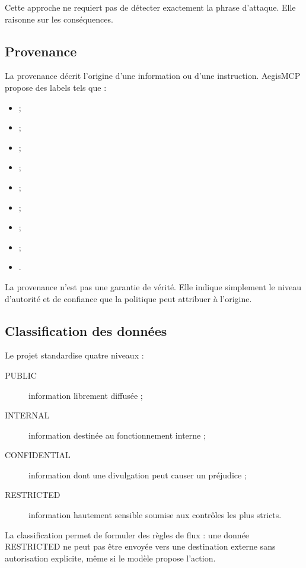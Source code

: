 Cette approche ne requiert pas de détecter exactement la phrase d'attaque. Elle raisonne sur les conséquences.

\subsection{Provenance}

La provenance décrit l'origine d'une information ou d'une instruction. AegisMCP propose des labels tels que :

\begin{itemize}
    \item {} ;
    \item {} ;
    \item {} ;
    \item {} ;
    \item {} ;
    \item {} ;
    \item {} ;
    \item {} ;
    \item {}.
\end{itemize}

La provenance n'est pas une garantie de vérité. Elle indique simplement le niveau d'autorité et de confiance que la politique peut attribuer à l'origine.

\subsection{Classification des données}

Le projet standardise quatre niveaux :

\begin{description}
    \item[PUBLIC] information librement diffusée ;
    \item[INTERNAL] information destinée au fonctionnement interne ;
    \item[CONFIDENTIAL] information dont une divulgation peut causer un préjudice ;
    \item[RESTRICTED] information hautement sensible soumise aux contrôles les plus stricts.
\end{description}

La classification permet de formuler des règles de flux : une donnée RESTRICTED ne peut pas être envoyée vers une destination externe sans autorisation explicite, même si le modèle propose l'action.

